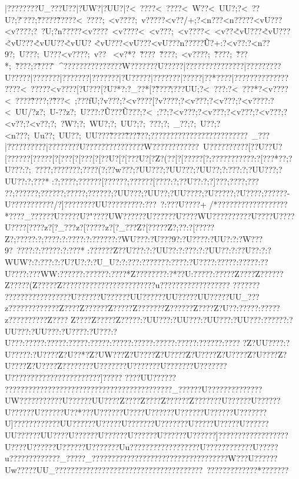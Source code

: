 {{{{{{{{{{{{{{{{{{{{{{{{{{{{{{{{{{{{{{{{{{{{{{{{{{{{{{{{{{{{{{{|?\???  {?\????{?\?U_??{?\?U??|?\?UW?|?\?UU?|?<~????\?<~????\?<~W??\?<~UU}?;?<~??U?;?\v???;?\~ ????\~?????<~????;~<v????;~v?????<v??/+;?<n??  ?<n?????<vU???<v????;?~?U;?n?????<v????~<v????<~<v???;~<v????<~<v??\~<vU???\~<vU???\~<vU???\~<vUU??\~<vUU?
\~<vU???\?<vU???\?<vU? ?{?n?????\~U?+:?<v?? :?<n??  9?;~U???;~U???<v????;~v??
 ~<v?* ?~\v????~\v????;~<v????;~\v????;~\v???*;~\v????;?\v????\~~^???????????????W???????U?????|???????????????|?????????U?????|???????|???????|???????|?U?????|???????|?????|?{?*???{?|?????{?\?????{?\???  {?\????{?<~????{?<v????[?\?U???[?\?U?*?:?\?_??*[?\~????\~;???UU;?<~??? :?<~???*?<v????<~????\~????;?\~??? <~;???fU;?v??? ;?<v????[?v????;?<v??? ;?<v??? ;?<v????:?<~UU/?z?;~U-??z?;~U???:?\~U? ??\~U???;?<~;?? ;?<v??? ;?<v??? ;?<v??? ;?<v??? ;?<v?? ;?<v?? ;?;~?W? ;?;~WU? ;?;~UU? ;?;~??? ;?;~_?? ;?;~U?? ;?<n??  ?;~Uu??;~UU? ?;~UU???\~??? ?\~?? ?\v??  ?;?????????????????????????~_???|? ?  ???? ?? ??|? ?? ?????U????????????{???W???{???????{??~U?{?{?????{?\? ?? [?{?U??U{?[?????{?[?????[?[? ?? [?[???[?[? ?U?[?[???U?[?Z? (??[?[?????[?;?????{??????:?[???*??;?U???:?;~????;???????;????(?;??w???;?UU???;?UU???;?UU??;?:?  ??:?;?UU???;?UU??:?;???*
:?;???  ?;??????[??????;??????[????:?;??U??:?;?]???;????;?????;?? ????;??????;?????;??  ????;?UU???;?UU??;?UU????;?U?????;?U????;???? ??-U???????????/?]????????UU?????????:???~?:???U???{?+
/*??{???? ??????? ??{???*?{???_???{???U?????U?"????UW? ?????U??{????U???{?WU???{??????{?U??{?{?U?? {?{?U???{?[???? z?[?_???z?[?????z?[?_???Z?[?????Z?;?? :?[?????Z?;?????:?;???? :?:???? :?:??????:?WU???:?U???9?:?U????:?UU?:?:?W???9?~????:?:?????:?:???*
:??????Z??U???:?:?UU??:?:?  ??:?:?UU??:?:??U??:?:?WUW?:?:? ? ?:?:?U?U?:?:?U_U?:?:?  ??:???????:????:?U????:?????:?????:??U????:???WW:?????? :??????:????*Z????????:?*??U:????? :?????Z???? Z?????? Z?????(Z????? Z????? ???????????????????u??????????????????
???????
??????? ??????? ???U??????U??????UU??????UU?????UU?????UU_???z???????{???? ??Z??  ??Z???? ??Z??? ??Z???????Z?????{?Z??? {?Z?U?{?:????{?:?????z???? {??????Z????  Z???? Z????? Z???? {?:?UU??{?:?UU??{?:?UU??{?:?UU??{?:?????{?:?UU??{?:?UU??{?:?U???{?:?U?? {?:?U?? {?:???? {?:???? {?:???? {?:???? {?:???? {?:???? {?:???? {?:???? {?:?????{?:???? {?Z?UU????:?U?????:?U???{?Z?U??*{?Z?UW??{?Z?U???{?Z?U???{?Z?U???{?Z?U???{?Z?U???{?Z?U???{?Z?U???{?Z????????U???????U???????U???????U???????U???????????????????????]?????  ????UU??????   ?????  ?????? ?????  ????  ?????? ?????????????????_??????U??????? ???????UW??{?????????U}??????UU????Z??   ??Z??  ??Z???? ??Z???? ??{?U?????{?U?????{?U?????{?U?????{?U??*??{?U?????{?U???{?U?????{?U?????{?U?????{?U???????U]??????  ??????UU??????U?????U???????U???????U?????U?????U??????UU??????UU???{?U?????{?U?????{?U?????{?U?????{?U?????{?]?????{?}?????{??????{?U???{?U?????{?U?????{?U???????Uu??????????????????U????????????U?????u?????????????_?????_???????????????????????????????????W???U??????Uw?????UU_????   ??????????????????????????????????~?????????????*???????
}}}}}}}}}}}}}}}}}}}}}}}}}}}}}}}}}}}}}}}}}}}}}}}}}}}}}}}}}}}}}}}}}}}}}}}}}}}}}}}}}}}}}}}}}}}}}}}}}}}}}}}}}}}}}}}}}}}}}}}}}}}}}}}}}}}}}}}}}}}}}}}}}}}}}}}}}}}}
